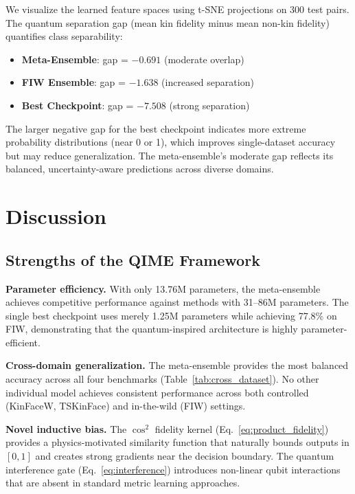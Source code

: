 \documentclass[journal,12pt]{IEEEtran}
\begin{document}
We visualize the learned feature spaces using t-SNE projections on 300
test pairs. The quantum separation gap (mean kin fidelity minus mean
non-kin fidelity) quantifies class separability:

\begin{itemize}
    \item \textbf{Meta-Ensemble}: gap = $-0.691$ (moderate overlap)
    \item \textbf{FIW Ensemble}: gap = $-1.638$ (increased separation)
    \item \textbf{Best Checkpoint}: gap = $-7.508$ (strong separation)
\end{itemize}

The larger negative gap for the best checkpoint indicates more extreme
probability distributions (near 0 or 1), which improves single-dataset
accuracy but may reduce generalization. The meta-ensemble's moderate
gap reflects its balanced, uncertainty-aware predictions across diverse
domains.

\section{Discussion}
\label{sec:discussion}

\subsection{Strengths of the QIME Framework}

\textbf{Parameter efficiency.} With only 13.76M parameters, the
meta-ensemble achieves competitive performance against methods with
31--86M parameters. The single best checkpoint uses merely 1.25M
parameters while achieving 77.8\% on FIW, demonstrating that the
quantum-inspired architecture is highly parameter-efficient.

\textbf{Cross-domain generalization.} The meta-ensemble provides the most
balanced accuracy across all four benchmarks (Table~\ref{tab:cross_dataset}).
No other individual model achieves consistent performance across both
controlled (KinFaceW, TSKinFace) and in-the-wild (FIW) settings.

\textbf{Novel inductive bias.} The $\cos^2$ fidelity kernel
(Eq.~\ref{eq:product_fidelity}) provides a physics-motivated similarity
function that naturally bounds outputs in $[0,1]$ and creates strong
gradients near the decision boundary. The quantum interference gate
(Eq.~\ref{eq:interference}) introduces non-linear qubit interactions that
are absent in standard metric learning approaches.
\end{document}
